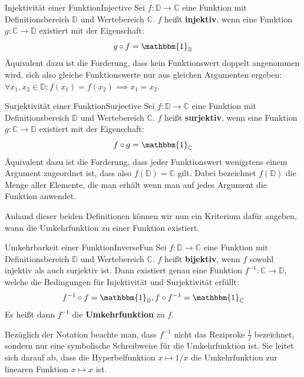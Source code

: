 \begin{definition}{Injektivität einer Funktion}{Injective}
    Sei $f: \mathbb{D} \to \mathbb{C}$ eine Funktion mit Definitionsbereich $\mathbb{D}$ und Wertebereich $\mathbb{C}$. $f$ heißt \textbf{injektiv}, wenn eine Funktion $g: \mathbb{C} \to \mathbb{D}$ existiert mit der Eigenschaft:
    $$
    g \circ f = \mathbbm{1}_\mathbb{D}
    $$
    Äquivalent dazu ist die Forderung, dass kein Funktionswert doppelt angenommen wird, sich also gleiche Funktionswerte nur aus gleichen Argumenten ergeben: $\forall x_1,x_2\in\mathbb{D}: f(x_1)=f(x_2) \implies x_1=x_2$.
\end{definition}

\begin{definition}{Surjektivität einer Funktion}{Surjective}
    Sei $f: \mathbb{D} \to \mathbb{C}$ eine Funktion mit Definitionsbereich $\mathbb{D}$ und Wertebereich $\mathbb{C}$. $f$ heißt \textbf{surjektiv}, wenn eine Funktion $g: \mathbb{C} \to \mathbb{D}$ existiert mit der Eigenschaft:
    $$
    f \circ g = \mathbbm{1}_\mathbb{C}
    $$
    Äquivalent dazu ist die Forderung, dass jeder Funktionswert wenigstens einem Argument zugeordnet ist, dass also $f(\mathbb{D}) = \mathbb{C}$ gilt. Dabei bezeichnet $f(\mathbb{D})$ die Menge aller Elemente, die man erhält wenn man auf jedes Argument die Funktion anwendet.
\end{definition}

Anhand dieser beiden Definitionen können wir nun ein Kriterium dafür angeben, wann die Umkehrfunktion zu einer Funktion existiert.

\begin{statement}{Umkehrbarkeit einer Funktion}{InverseFun}
    Sei $f: \mathbb{D} \to \mathbb{C}$ eine Funktion mit Definitionsbereich $\mathbb{D}$ und Wertebereich $\mathbb{C}$. $f$ heißt \textbf{bijektiv}, wenn $f$ sowohl injektiv als auch surjektiv ist. Dann existiert genau eine Funktion $f^{-1}: \mathbb{C} \to \mathbb{D}$, welche die Bedingungen für Injektivität und Surjektivität erfüllt:
    $$
    f^{-1} \circ f = \mathbbm{1}_\mathbb{D}, f \circ f^{-1} = \mathbbm{1}_\mathbb{C}
    $$
    Es heißt dann $f^{-1}$ die \textbf{Umkehrfunktion} zu $f$.
\end{statement}

Bezüglich der Notation beachte man, dass $f^{-1}$ nicht das Reziproke $\frac{1}{f}$ bezeichnet, sondern nur eine symbolische Schreibweise für die Umkehrfunktion ist. Sie leitet sich darauf ab, dass die Hyperbelfunktion $x \mapsto 1/x$ die Umkehrfunktion zur linearen Funktion $x \mapsto x$ ist.

